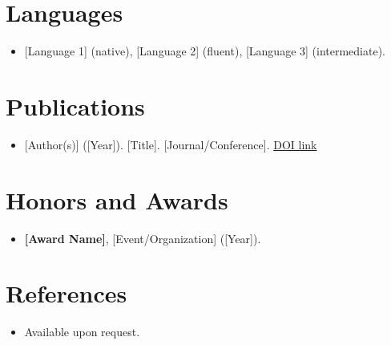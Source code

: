 \documentclass[11pt,a4paper,sans]{moderncv}
\begin{document}

\section{Languages}
\vspace{1pt}
\begin{itemize}
\item {[Language 1] (native), [Language 2] (fluent), [Language 3] (intermediate).}
\end{itemize}


\section{Publications}
\vspace{1pt}
\begin{itemize}
\item {[Author(s)] ([Year]). [Title]. [Journal/Conference]. \href{[DOI_URL]}{DOI link}}
\end{itemize}


\section{Honors and Awards}
\vspace{1pt}
\begin{itemize}
\item{\textbf{[Award Name]}, [Event/Organization] ([Year]).}
\end{itemize}


\section{References}
\vspace{1pt}
\begin{itemize}
\item{Available upon request.}
\end{itemize}
\end{document}
